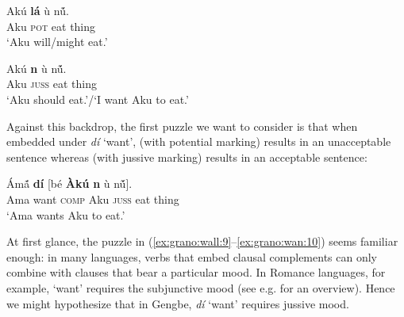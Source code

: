 \documentclass[output=paper,modfonts,nonflat]{langsci/langscibook}
\begin{document}
\ea \label{ex:grano:pot:7}
\gll Ak\'u \textbf{l\'a} {\D}\`u n\'{\~u}.\\
Aku \textsc{pot} eat thing\\
\glt `Aku will/might eat.' %
\z

\ea \label{ex:grano:juss:8}
\gll Ak\'u \textbf{n{\É}} {\D}\`u n\'{\~u}.\\
Aku \textsc{juss} eat thing\\
\glt`Aku should eat.'/`I want Aku to eat.' %
\z

Against this backdrop, the first puzzle we want to consider is that when embedded under \emph{d{\Z}\'i} `want',  (with potential marking) results in an unacceptable sentence whereas  (with jussive marking) results in an acceptable sentence:

\z

\ea \label{ex:grano:wan:10}
\gll \'Am\'{\~a} \textbf{d{\Z}\'i} [b\'e \textbf{\`Ak\'u} \textbf{n{\É}} {\D}\`u n\'{\~u}].\\
Ama want \textsc{comp} Aku \textsc{juss} eat thing\\
\glt `Ama wants Aku to eat.' %
\z

At first glance, the puzzle in (\ref{ex:grano:wall:9}--\ref{ex:grano:wan:10}) seems familiar enough: in many languages, verbs that embed clausal complements can only combine with clauses that bear a particular mood. In Romance languages, for example, `want' requires the subjunctive mood (see e.g. \cite{Palmer2001} for an overview). Hence we might hypothesize that in Gengbe, \emph{d{\Z}\'i} `want' requires jussive mood. 
\end{document}
